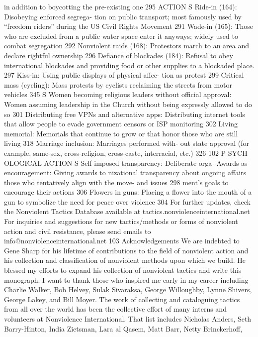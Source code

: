 \documentclass[twoside,a4paper,12pt,fleqn,openany]{extbook}
\begin{document}
in addition to boycotting the pre-existing
one
 295
ACTION S
Ride-in (164): Disobeying enforced segrega-
tion on public transport; most famously used
by “freedom riders” during the US Civil Rights
Movement
 291
Wade-in (165): Those who are excluded from
a public water space enter it anyways; widely
used to combat segregation
 292
Nonviolent raids (168): Protestors march to an
area and declare rightful ownership
 296
Defiance of blockades (184): Refusal to obey
international blockades and providing food or
other supplies to a blockaded place.
 297
Kiss-in: Using public displays of physical affec-
tion as protest
 299
Critical mass (cycling): Mass protests by cyclists
reclaiming the streets from motor vehicles 345
S
Women becoming religious leaders without
official approval: Women assuming leadership
in the Church without being expressly allowed
to do so
 301
Distributing free VPNs and alternative
apps: Distributing internet tools that allow
people to evade government censors or ISP
monitoring
 302
Living memorial: Memorials that continue to
grow or that honor those who are still living		
318
Marriage inclusion: Marriages performed with-
out state approval (for example, same-sex,
cross-religion, cross-caste, interracial, etc.)		
326
102
P SYCH OLOGICAL ACTION S
Self-imposed transparency: Deliberate orga-
 Awards as encouragement: Giving awards to
nizational transparency about ongoing affairs
 those who tentatively align with the move-
and issues
 298
 ment’s goals to encourage their actions 306
Flowers in guns: Placing a flower into the
mouth of a gun to symbolize the need for
peace over violence
 304
For further updates, check the Nonviolent Tactics Database available at
tactics.nonviolenceinternational.net
For inquiries and suggestions for new tactics/methods or forms of nonviolent action
and civil resistance, please send emails to info@nonviolenceinternational.net
103
Acknowledgements
We are indebted to Gene Sharp for his lifetime of contributions to the field of nonviolent action and his
collection and classification of nonviolent methods upon which we build. He blessed my efforts to expand
his collection of nonviolent tactics and write this monograph.
I want to thank those who inspired me early in my career including Charlie Walker, Bob Helvey, Sulak Sivaraksa,
George Willoughby, Lynne Shivers, George Lakey, and Bill Moyer.
The work of collecting and cataloguing tactics from all over the world has been the collective effort of many
interns and volunteers at Nonviolence International.
That list includes Nicholas Anders, Seth Barry-Hinton, India Zietsman, Lara al Qasem, Matt Barr, Netty Brinckerhoff,
\end{document}
